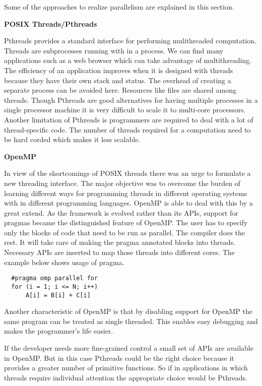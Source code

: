 Some of the approaches to realize parallelism are explained in this section.

\noindent
\textbf{POSIX Threads/Pthreads}

\noindent
Pthreads provides a standard interface for performing mulithreaded computation. 
Threads are subprocesses running with in a process. 
We can find many applications such as a web browser which can take advantage of multithreading.
The efficiency of an application improves when it is designed with threads because they have their
own stack and status. The overhead of creating a separate process can be avoided here.
Resources like files are shared among threads. Though Pthreads are good alternatives for
having multiple processes in a single processor machine it is very difficult to scale
it to multi-core processors. Another limitation of Pthreads is programmers are required to
deal with a lot of thread-specific code. The number of threads required for a computation
need to be hard corded which makes it less scalable.


\noindent
\textbf{OpenMP}

\noindent
In view of the shortcomings of POSIX threads there was an urge to formulate a new threading
interface. The major objective was to overcome the burden of learning different ways for programming threads in different
operating systems with in different programming languages. OpenMP is able to deal with this
by a great extend. As the framework is evolved rather than its APIs, support for pragmas became the distinguished
feature of OpenMP. The user has to specify only the blocks of code that need to be run
as parallel. The compiler does the rest. It will take care of making the pragma annotated blocks into
threads. Necessary APIs are inserted to map those threads into different cores. The example below
shows usage of pragma.

{\footnotesize
\begin{lstlisting}
  #pragma omp parallel for
  for (i = 1; i <= N; i++)
      A[i] = B[i] + C[i]
\end{lstlisting}
}

Another characteristic of OpenMP is that by disabling support for OpenMP the same program can be treated as
single threaded. This enables easy debugging and makes the programmer's life easier.

If the developer needs more fine-grained control a small set of APIs are available in OpenMP. But in this case Pthreads
could be the right choice because it provides a greater number of primitive functions. So if in applications
in which threads require individual attention the appropriate choice would be Pthreads.

